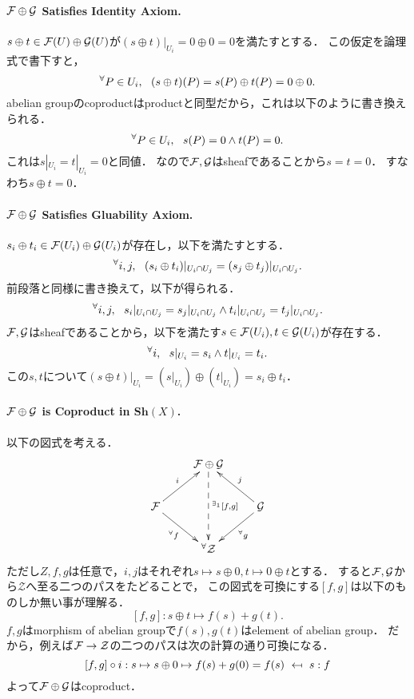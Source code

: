 \documentclass[a4paper]{jsarticle}
\newcommand{\Sh}{\mathbf{Sh}}
\begin{document}
    \paragraph{$\mathcal{F} \oplus \mathcal{G}$ Satisfies Identity Axiom.}
    $s \oplus t \in \mathcal{F}(U) \oplus \mathcal{G}(U)$が$(s \oplus t)|_{U_i}=0 \oplus 0=0$を満たすとする．
    この仮定を論理式で書下すと，
    \[ {}^{\forall} P \in U_i,~~ (s \oplus t)(P)=s(P) \oplus t(P)=0 \oplus 0. \]
    abelian groupのcoproductはproductと同型だから，これは以下のように書き換えられる．
    \[ {}^{\forall} P \in U_i,~~ s(P)=0 \land t(P)=0. \]
    これは$s|_{U_i}=t|_{U_i}=0$と同値．
    なので$\mathcal{F},\mathcal{G}$はsheafであることから$s=t=0$．
    すなわち$s \oplus t=0$．

    \paragraph{$\mathcal{F} \oplus \mathcal{G}$ Satisfies Gluability Axiom.}
    $s_i \oplus t_i \in \mathcal{F}(U_i) \oplus \mathcal{G}(U_i)$が存在し，以下を満たすとする．
    \[ {}^{\forall} i,j,~~ (s_i \oplus t_i)|_{U_i \cap U_j}=(s_j \oplus t_j)|_{U_i \cap U_j}. \]
    前段落と同様に書き換えて，以下が得られる．
    \[ {}^{\forall} i,j,~~ s_i|_{U_i \cap U_j}=s_j|_{U_i \cap U_j} \land t_i|_{U_i \cap U_j}=t_j|_{U_i \cap U_j}. \]
    $\mathcal{F},\mathcal{G}$はsheafであることから，以下を満たす$s \in \mathcal{F}(U_i),t \in \mathcal{G}(U_i)$が存在する．
    \[ {}^{\forall} i,~~ s|_{U_i}=s_i \land t|_{U_i}=t_i. \]
    この$s,t$について$(s \oplus t)|_{U_i}=(s|_{U_i}) \oplus (t|_{U_i})=s_i \oplus t_i$．

    \paragraph{$\mathcal{F} \oplus \mathcal{G}$ is Coproduct in $\Sh(X)$.}
    以下の図式を考える．
    \[
    \xymatrix
    {
        {} & \shF \oplus \shG \ar@{-->}[dd]^-{{}^{\exists_1} [f,g]}& {} \\
        \shF \ar[rd]_-{{}^\forall f} \ar[ru]^-{i}& {} & \shG \ar[ld]^-{{}^\forall g} \ar[lu]_-{j}\\
        {} & {}^\forall \mathcal{Z} & {}
    }
    \]
    ただし$Z,f,g$は任意で，$i, j$はそれぞれ$s \mapsto s \oplus 0, t \mapsto 0 \oplus t$とする．
    すると$\mathcal{F}, \mathcal{G}$から$\mathcal{Z}$へ至る二つのパスをたどることで，
    この図式を可換にする$[f,g]$は以下のものしか無い事が理解る．
    \[ [f,g]: s \oplus t \mapsto f(s)+g(t). \]
    $f,g$はmorphism of abelian groupで$f(s),g(t)$はelement of abelian group．
    だから，例えば$\mathcal{F} \to \mathcal{Z}$の二つのパスは次の計算の通り可換になる．
    \[ [f,g] \circ i : s \mapsto s \oplus 0 \mapsto f(s)+g(0)=f(s) ~\mapsfrom~ s: f \]
    よって$\mathcal{F} \oplus \mathcal{G}$はcoproduct．
\end{document}
